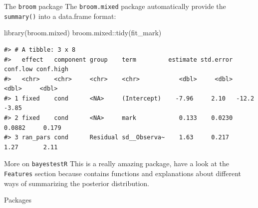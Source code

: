 \documentclass[
  ignorenonframetext,
]{beamer}
\newenvironment{Shaded}{\begin{snugshade}}{\end{snugshade}}
\newcommand{\FunctionTok}[1]{\textcolor[rgb]{0.28,0.35,0.67}{#1}}
\newcommand{\NormalTok}[1]{\textcolor[rgb]{0.00,0.23,0.31}{#1}}
\newcommand{\SpecialCharTok}[1]{\textcolor[rgb]{0.37,0.37,0.37}{#1}}
\begin{document}
\begin{frame}[fragile]{The \texttt{broom} package}
\label{the-broom-package}
The \texttt{broom.mixed} package automatically provide the
\texttt{summary()} into a data.frame format:

\begin{Shaded}
\begin{Highlighting}[]
\FunctionTok{library}\NormalTok{(broom.mixed)}
\NormalTok{broom.mixed}\SpecialCharTok{::}\FunctionTok{tidy}\NormalTok{(fit\_mark)}
\end{Highlighting}
\end{Shaded}

\begin{verbatim}
#> # A tibble: 3 x 8
#>   effect   component group    term         estimate std.error conf.low conf.high
#>   <chr>    <chr>     <chr>    <chr>           <dbl>     <dbl>    <dbl>     <dbl>
#> 1 fixed    cond      <NA>     (Intercept)    -7.96     2.10   -12.2       -3.85 
#> 2 fixed    cond      <NA>     mark            0.133    0.0230   0.0882     0.179
#> 3 ran_pars cond      Residual sd__Observa~    1.63     0.217    1.27       2.11
\end{verbatim}
\end{frame}

\begin{frame}[fragile]{More on \texttt{bayestestR}}
\label{more-on-bayestestr}
This is a really amazing package, have a look at the \texttt{Features}
section because contains functions and explanations about different ways
of summarizing the posterior distribution.
\end{frame}

\begin{frame}{Packages}
\label{packages}
\end{frame}
\end{document}
